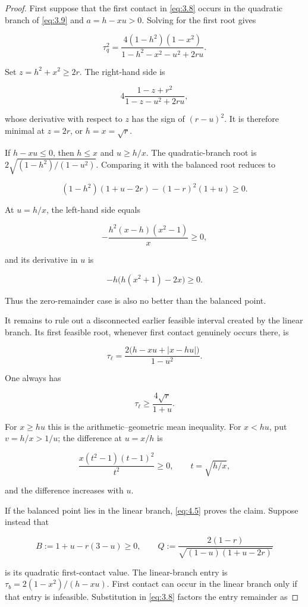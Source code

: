 \documentclass[11pt]{article}
\begin{document}
\begin{proof}
First suppose that the first contact in \eqref{eq:3.8} occurs in the quadratic
branch of \eqref{eq:3.9} and $a=h-xu>0$. Solving for the first root gives

\[
\tau_q^2=
\frac{4(1-h^2)(1-x^2)}
{1-h^2-x^2-u^2+2ru}.
\tag{4.2}\label{eq:4.2}
\]

Set $z=h^2+x^2\ge2r$. The right-hand side is

\[
4\frac{1-z+r^2}{1-z-u^2+2ru},
\]

whose derivative with respect to $z$ has the sign of $(r-u)^2$. It is therefore
minimal at $z=2r$, or $h=x=\sqrt r$.

If $h-xu\le0$, then $h\le x$ and $u\ge h/x$. The quadratic-branch root is
$2\sqrt{(1-h^2)/(1-u^2)}$. Comparing it with the balanced root reduces to

\[
(1-h^2)(1+u-2r)-(1-r)^2(1+u)\ge0.
\tag{4.3}\label{eq:4.3}
\]

At $u=h/x$, the left-hand side equals

\[
-\frac{h^2(x-h)(x^2-1)}x\ge0,
\]

and its derivative in $u$ is

\[
-h\bigl(h(x^2+1)-2x\bigr)\ge0.
\]

Thus the zero-remainder case is also no better than the balanced point.

It remains to rule out a disconnected earlier feasible interval created by the
linear branch. Its first feasible root, whenever first contact genuinely occurs
there, is

\[
\tau_\ell=
\frac{2\bigl(h-xu+|x-hu|\bigr)}{1-u^2}.
\tag{4.4}\label{eq:4.4}
\]

One always has

\[
\tau_\ell\ge\frac{4\sqrt r}{1+u}.
\tag{4.5}\label{eq:4.5}
\]

For $x\ge hu$ this is the arithmetic--geometric mean inequality. For $x<hu$,
put $v=h/x>1/u$; the difference at $u=x/h$ is

\[
\frac{x(t^2-1)(t-1)^2}{t^2}\ge0,
\qquad t=\sqrt{h/x},
\]

and the difference increases with $u$.

If the balanced point lies in the linear branch, \eqref{eq:4.5} proves the claim. Suppose
instead that

\[
B:=1+u-r(3-u)\ge0,
\qquad
Q:=\frac{2(1-r)}{\sqrt{(1-u)(1+u-2r)}}
\tag{4.6}\label{eq:4.6}
\]

is its quadratic first-contact value. The linear-branch entry is
$\tau_b=2(1-x^2)/(h-xu)$. First contact can occur in the linear branch only if
that entry is infeasible. Substitution in \eqref{eq:3.8} factors the entry remainder as


\end{proof}
\end{document}
